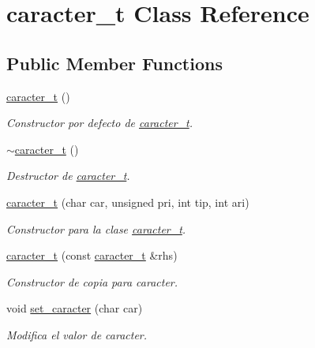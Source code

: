 \hypertarget{classcaracter__t}{}\section{caracter\+\_\+t Class Reference}
\label{classcaracter__t}
\subsection*{Public Member Functions}
\begin{DoxyCompactItemize}
\item 
\mbox{\label{classcaracter__t_aa0f08c59bdb279897ac31280187b73c9}} 
\hyperlink{classcaracter__t_aa0f08c59bdb279897ac31280187b73c9}{caracter\+\_\+t} ()
\begin{DoxyCompactList}\small\item\em Constructor por defecto de \hyperlink{classcaracter__t}{caracter\+\_\+t}. \end{DoxyCompactList}\item 
\mbox{\label{classcaracter__t_a814e1e7b262ad0cb330f32ec9047e0ac}} 
\hyperlink{classcaracter__t_a814e1e7b262ad0cb330f32ec9047e0ac}{$\sim$caracter\+\_\+t} ()
\begin{DoxyCompactList}\small\item\em Destructor de \hyperlink{classcaracter__t}{caracter\+\_\+t}. \end{DoxyCompactList}\item 
\hyperlink{classcaracter__t_a9040b01285473517675854109c201deb}{caracter\+\_\+t} (char car, unsigned pri, int tip, int ari)
\begin{DoxyCompactList}\small\item\em Constructor para la clase \hyperlink{classcaracter__t}{caracter\+\_\+t}. \end{DoxyCompactList}\item 
\hyperlink{classcaracter__t_ace18cbfb6602aec0c63711b8c4b0b3a1}{caracter\+\_\+t} (const \hyperlink{classcaracter__t}{caracter\+\_\+t} \&rhs)
\begin{DoxyCompactList}\small\item\em Constructor de copia para caracter. \end{DoxyCompactList}\item 
void \hyperlink{classcaracter__t_af177f16931bb69024c5a766948985786}{set\+\_\+caracter} (char car)
\begin{DoxyCompactList}\small\item\em Modifica el valor de caracter. \end{DoxyCompactList}\item 

\end{DoxyCompactItemize}
